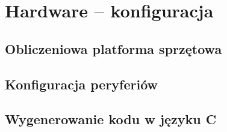 \chapter{Hardware -- konfiguracja}

\section{Obliczeniowa platforma sprzętowa}

\section{Konfiguracja peryferiów}

\section{Wygenerowanie kodu w języku C}
\label{sec:configGenerate}